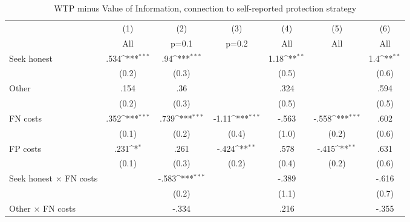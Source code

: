 \begin{table}[htbp]\centering
\def\sym#1{\ifmmode^{#1}\else\(^{#1}\)\fi}
\caption{WTP minus Value of Information, connection to self-reported protection strategy}
\begin{tabular}{l*{6}{c}}
\hline\hline
                &\multicolumn{1}{c}{(1)}&\multicolumn{1}{c}{(2)}&\multicolumn{1}{c}{(3)}&\multicolumn{1}{c}{(4)}&\multicolumn{1}{c}{(5)}&\multicolumn{1}{c}{(6)}\\
                &\multicolumn{1}{c}{All}&\multicolumn{1}{c}{p=0.1}&\multicolumn{1}{c}{p=0.2}&\multicolumn{1}{c}{All}&\multicolumn{1}{c}{All}&\multicolumn{1}{c}{All}\\
\hline
Seek honest     &     .534\sym{***}&      .94\sym{***}&                  &     1.18\sym{**} &                  &      1.4\sym{**} \\
                &    (0.2)         &    (0.3)         &                  &    (0.5)         &                  &    (0.6)         \\
Other           &     .154         &      .36         &                  &     .324         &                  &     .594         \\
                &    (0.2)         &    (0.3)         &                  &    (0.5)         &                  &    (0.5)         \\
FN costs        &     .352\sym{***}&     .739\sym{***}&    -1.11\sym{***}&    -.563         &    -.558\sym{***}&     .602         \\
                &    (0.1)         &    (0.2)         &    (0.4)         &    (1.0)         &    (0.2)         &    (0.6)         \\
FP costs        &     .231\sym{*}  &     .261         &    -.424\sym{**} &     .578         &    -.415\sym{**} &     .631         \\
                &    (0.1)         &    (0.3)         &    (0.2)         &    (0.4)         &    (0.2)         &    (0.6)         \\
Seek honest $\times$ FN costs&                  &    -.583\sym{***}&                  &    -.389         &                  &    -.616         \\
                &                  &    (0.2)         &                  &    (1.1)         &                  &    (0.7)         \\
Other $\times$ FN costs&                  &    -.334         &                  &     .216         &                  &    -.355         \\

\end{tabular}
\end{table}
